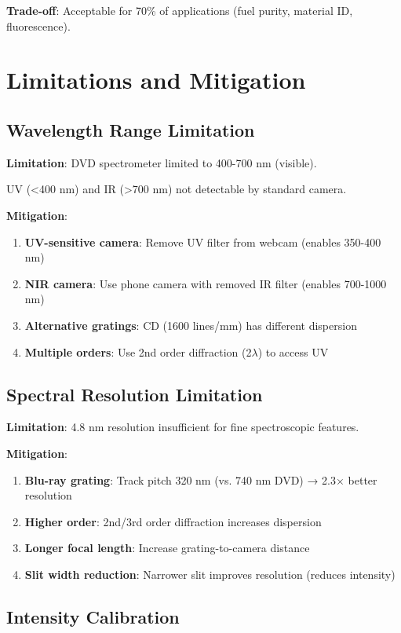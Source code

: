 \documentclass[12pt,a4paper]{article}
\begin{document}
\textbf{Trade-off}: Acceptable for 70\% of applications (fuel purity, material ID, fluorescence).

\section{Limitations and Mitigation}

\subsection{Wavelength Range Limitation}

\textbf{Limitation}: DVD spectrometer limited to 400-700 nm (visible).

UV (<400 nm) and IR (>700 nm) not detectable by standard camera.

\textbf{Mitigation}:
\begin{enumerate}
\item \textbf{UV-sensitive camera}: Remove UV filter from webcam (enables 350-400 nm)
\item \textbf{NIR camera}: Use phone camera with removed IR filter (enables 700-1000 nm)
\item \textbf{Alternative gratings}: CD (1600 lines/mm) has different dispersion
\item \textbf{Multiple orders}: Use 2nd order diffraction (2$\lambda$) to access UV
\end{enumerate}

\subsection{Spectral Resolution Limitation}

\textbf{Limitation}: 4.8 nm resolution insufficient for fine spectroscopic features.

\textbf{Mitigation}:
\begin{enumerate}
\item \textbf{Blu-ray grating}: Track pitch 320 nm (vs. 740 nm DVD) → 2.3× better resolution
\item \textbf{Higher order}: 2nd/3rd order diffraction increases dispersion
\item \textbf{Longer focal length}: Increase grating-to-camera distance
\item \textbf{Slit width reduction}: Narrower slit improves resolution (reduces intensity)
\end{enumerate}

\subsection{Intensity Calibration}
\end{document}
